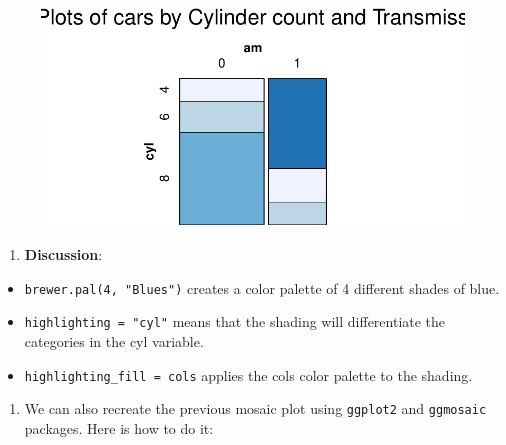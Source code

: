 \documentclass[
  letterpaper,
  DIV=11,
  numbers=noendperiod]{scrreport}
\providecommand{\tightlist}{%
  \setlength{\itemsep}{0pt}\setlength{\parskip}{0pt}}\usepackage{longtable,booktabs,array}
\begin{document}
\begin{figure}[H]

{\centering \includegraphics{08CategoricalData02_files/figure-pdf/unnamed-chunk-27-1.pdf}

}

\end{figure}

\begin{enumerate}
\def\labelenumi{\arabic{enumi}.}
\setcounter{enumi}{8}
\tightlist
\item
  \textbf{Discussion}:
\end{enumerate}

\begin{itemize}
\item
  \texttt{brewer.pal(4,\ "Blues")} creates a color palette of 4
  different shades of blue.
\item
  \texttt{highlighting\ =\ "cyl"} means that the shading will
  differentiate the categories in the cyl variable.
\item
  \texttt{highlighting\_fill\ =\ cols} applies the cols color palette to
  the shading.
\end{itemize}

\begin{enumerate}
\def\labelenumi{\arabic{enumi}.}
\setcounter{enumi}{9}
\tightlist
\item
  We can also recreate the previous mosaic plot using \texttt{ggplot2}
  and \texttt{ggmosaic} packages. Here is how to do it:
\end{enumerate}
\end{document}
